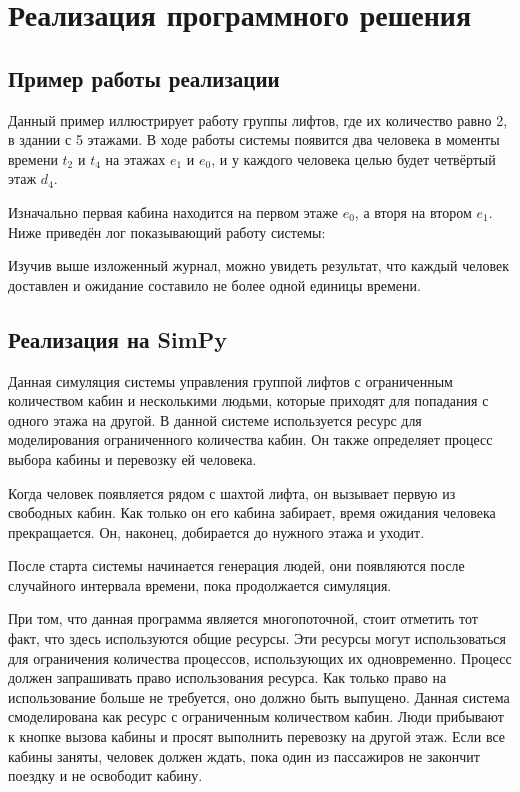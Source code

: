 	\section{Реализация программного решения}

		\subsection{Пример работы реализации}

	Данный пример иллюстрирует работу группы лифтов, где их количество равно 2, в здании с 5 этажами.
		В ходе работы системы появится два человека в моменты времени $t_2$ и $t_4$ на этажах $e_1$ и $e_0$,
		и у каждого человека целью будет четвёртый этаж $d_4$.

	Изначально первая кабина находится на первом этаже $e_0$, а вторя на втором $e_1$.
		Ниже приведён лог показывающий работу системы:

	Изучив выше изложенный журнал, можно увидеть результат, что каждый человек доставлен и ожидание составило не более одной единицы времени.


		\subsection{Реализация на SimPy}

			Данная симуляция системы управления группой лифтов с ограниченным количеством кабин и несколькими людьми,
				которые приходят для попадания с одного этажа на другой.
				В данной системе используется ресурс для моделирования ограниченного количества кабин.
				Он также определяет процесс выбора кабины и перевозку ей человека.

			Когда человек появляется рядом с шахтой лифта, он вызывает первую из свободных кабин.
				Как только он его кабина забирает, время ожидания человека прекращается.
				Он, наконец, добирается до нужного этажа и уходит.

			После старта системы начинается генерация людей, они появляются после случайного интервала времени,
			пока продолжается симуляция.


			При том, что данная программа является многопоточной, стоит отметить тот факт, что здесь используются общие ресурсы.
				Эти ресурсы могут использоваться для ограничения количества процессов, использующих их одновременно.
				Процесс должен запрашивать право использования ресурса. Как только право на использование больше не требуется,
				оно должно быть выпущено. Данная система смоделирована как ресурс с ограниченным количеством кабин.
				Люди прибывают к кнопке вызова кабины и просят выполнить перевозку на другой этаж.
				Если все кабины заняты, человек должен ждать, пока один из пассажиров не закончит поездку и не освободит кабину.

